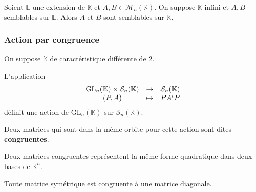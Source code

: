 
  \begin{theorem}
    Soient $\mathbb{L}$ une extension de $\mathbb{K}$ et $A, B \in \mathcal{M}_n(\mathbb{K})$. On suppose $\mathbb{K}$ infini et $A, B$  semblables sur $\mathbb{L}$. Alors $A$ et $B$ sont semblables sur $\mathbb{K}$.
  \end{theorem}

  \subsubsection{Action par congruence}


  On suppose $\mathbb{K}$ de caractéristique différente de $2$.

  \begin{proposition}
    L'application
    \[
    \begin{array}{ccc}
      \mathrm{GL}_n(\mathbb{K}) \times \mathcal{S}_n(\mathbb{K}) &\rightarrow& \mathcal{S}_n(\mathbb{K}) \\
      (P, A) &\mapsto& PA\mathstrut ^t P
    \end{array}
    \]
    définit une action de $\mathrm{GL}_n(\mathbb{K})$ sur $\mathcal{S}_n(\mathbb{K})$.
  \end{proposition}

  \begin{definition}
    Deux matrices qui sont dans la même orbite pour cette action sont dites \textbf{congruentes}.
  \end{definition}

  \begin{remark}
    Deux matrices congruentes représentent la même forme quadratique dans deux bases de $\mathbb{K}^n$.
  \end{remark}

  \begin{theorem}
    Toute matrice symétrique est congruente à une matrice diagonale.
  \end{theorem}

